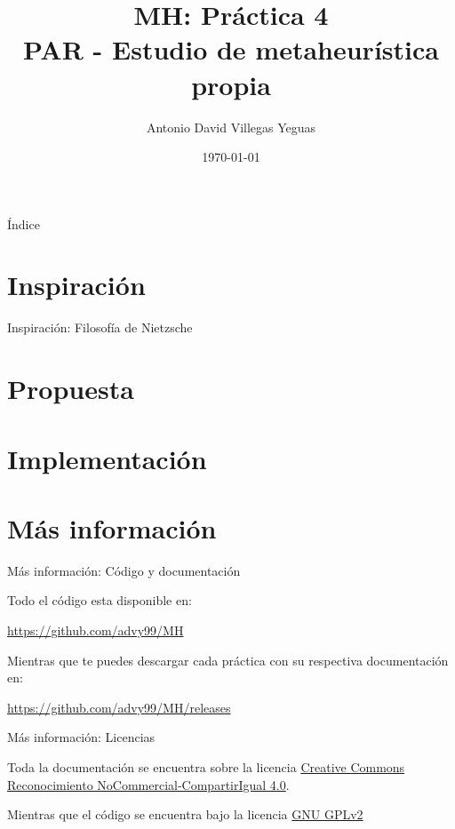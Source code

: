 \documentclass{beamer}
\title{MH: Práctica 4\\
			PAR - Estudio de metaheurística propia}
\date{\today}
\author{Antonio David Villegas Yeguas}
\institute{Universidad de Granada\\
\medskip
\textit{advy99@correo.ugr.es}
}
\begin{document}
 \maketitle

\begin{frame}{Índice}
\tableofcontents
\end{frame}
  
  
\section{Inspiración}
\begin{frame}{Inspiración: Filosofía de Nietzsche}
    
\end{frame}
  
  
  
\section{Propuesta}
  
\section{Implementación}
  
\section{Más información}
  
\begin{frame}{Más información: Código y documentación}

	Todo el código esta disponible en: 
	
	\begin{center}
		\url{https://github.com/advy99/MH}	
	\end{center}
	
	Mientras que te puedes descargar cada práctica con su respectiva documentación en:
	
	\begin{center}
		\url{https://github.com/advy99/MH/releases}	
	\end{center}

	
\end{frame}	  
  
\begin{frame}{Más información: Licencias}
  
	Toda la documentación se encuentra sobre la licencia
 	\href{https://creativecommons.org/licenses/by-nc-sa/4.0/deed.es}{Creative Commons
	Reconocimiento NoCommercial-CompartirIgual 4.0}.

	\begin{center}\ccbyncsa\end{center}

	\vspace{1cm}

	Mientras que el código se encuentra bajo la licencia \href{https://www.gnu.org/licenses/old-licenses/gpl-2.0.html}{GNU GPLv2}
  
\end{frame}
\end{document}
